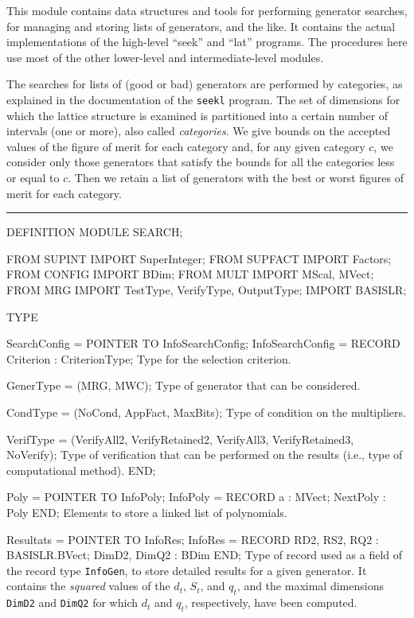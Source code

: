 
This module contains data structures and tools 
for performing generator searches, for managing and storing lists
of generators, and the like.
It contains the actual implementations of the
high-level ``seek'' and ``lat'' programs.
The procedures here use most of the other 
lower-level and intermediate-level modules.

The searches for lists of (good or bad) generators are 
performed by categories, as explained in
the documentation of the {\tt seekl} program.
The set of dimensions for which the lattice structure is examined
is partitioned into a certain number of intervals (one or more),
also called {\em categories\/}.
We give bounds on the accepted values of the figure of merit
for each category and, for any given category $c$,
we consider only those generators that satisfy the bounds 
for all the categories less or equal to $c$.
Then we retain a list of generators with the best or worst figures of
merit for each category.


\bigskip\hrule
\code

DEFINITION MODULE SEARCH;

FROM SUPINT   IMPORT SuperInteger;
FROM SUPFACT  IMPORT Factors;
FROM CONFIG   IMPORT BDim;
FROM MULT     IMPORT MScal, MVect;
FROM MRG      IMPORT TestType, VerifyType, OutputType; 
IMPORT BASISLR;

TYPE

   SearchConfig = POINTER TO InfoSearchConfig;
   InfoSearchConfig = RECORD
      Criterion  : CriterionType;
\endcode
 \tabb Type for the selection criterion. \endtabb
\code

      GenerType   = (MRG, MWC);
\endcode
 \tabb Type of generator that can be considered. \endtabb
\code

      CondType    = (NoCond, AppFact, MaxBits);
\endcode
 \tabb Type of condition on the multipliers. \endtabb
\code

      VerifType   = (VerifyAll2, VerifyRetained2, 
                  VerifyAll3, VerifyRetained3, NoVerify);
\endcode
 \tabb Type of verification that can be performed on the results
    (i.e., type of computational method). \endtabb
\code
      END;

   Poly        = POINTER TO InfoPoly;
   InfoPoly    = RECORD
      a        : MVect;
      NextPoly : Poly
      END;
\endcode
 \tabb  Elements to store a linked list of polynomials.  \endtabb
\code

   Resultats   = POINTER TO InfoRes;
   InfoRes     = RECORD
      RD2, RS2, RQ2 : BASISLR.BVect;
      DimD2, DimQ2  : BDim
      END;
\endcode
 \tabb  Type of record used as a field of the record type {\tt InfoGen},
    to store detailed results for a given generator. 
    It contains the {\em squared\/} values of the $d_t$, $S_t$, and $q_t$,
    and the maximal dimensions {\tt DimD2} and {\tt DimQ2} 
    for which $d_t$ and $q_t$, respectively, have been computed.
 \endtabb
\code

